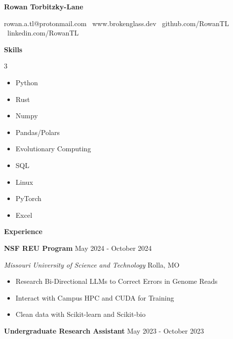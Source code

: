 \documentclass[11pt]{article}
\begin{document}
\begin{center}
    \textbf{\huge Rowan Torbitzky-Lane}\\
    \hrulefill
\end{center}

\begin{center}
    rowan.a.tl@protonmail.com \textbullet \ www.brokenglass.dev \textbullet \ github.com/RowanTL \textbullet  \ linkedin.com/RowanTL
\end{center}


\begin{center}
    \textbf{Skills}
\end{center}

\begin{multicols}{3}
    \begin{itemize}[noitemsep, topsep=0pt, partopsep=0pt, parsep=0pt, itemsep=0pt]
        \item Python
        \item Rust
        \item Numpy
        \item Pandas/Polars
        \item Evolutionary Computing
        \item SQL
        \item Linux
        \item PyTorch
        \item Excel
    \end{itemize}
\end{multicols}

\begin{center}
    \textbf{Experience}
\end{center}

\textbf{NSF REU Program} \hfill May 2024 - October 2024

\textsl{Missouri University of Science and Technology} \hfill Rolla, MO
\begin{itemize}[noitemsep, topsep=0pt, partopsep=0pt, parsep=0pt, itemsep=0pt]
    \item Research Bi-Directional LLMs to Correct Errors in Genome Reads
    \item Interact with Campus HPC and CUDA for Training
    \item Clean data with Scikit-learn and Scikit-bio
\end{itemize}


\textbf{Undergraduate Research Assistant} \hfill May 2023 - October 2023
\end{document}
